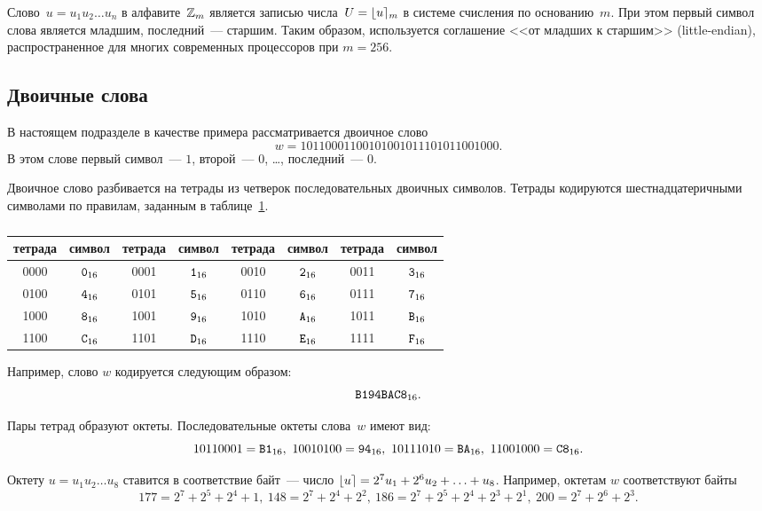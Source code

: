 Слово~$u=u_1 u_2\ldots u_n$ в алфавите~$\mathbb{Z}_m$ является записью 
числа~$U=\lfloor u\rceil_m$ в системе счисления по основанию~$m$. 
При этом первый символ слова является младшим, последний~--- старшим.
%
Таким образом, используется соглашение <<от младших к старшим>> 
(little-endian), распространенное для многих современных процессоров при 
$m=256$. 

\subsection{Двоичные слова}\label{DEFS.BinWords}

В настоящем подразделе в качестве примера рассматривается двоичное слово
$$
w=1011 0001 1001 0100 1011 1010 1100 1000.
$$
В этом слове первый символ~--- $1$, 
второй~--- $0$, \ldots, последний~--- $0$.

Двоичное слово разбивается на тетрады из четверок последовательных 
двоичных символов. 
%
Тетрады кодируются шестнадцатеричными символами по правилам, заданным в 
таблице~\ref{Table.Hex}.

\begin{table}[H]
\caption{}\label{Table.Hex}
\begin{tabular}{|c|c||c|c||c|c||c|c|}
\hline
тетрада & символ & тетрада & символ & тетрада & символ & тетрада & символ\\
\hline
0000 & $\texttt{0}_{16}$ & 0001 & $\texttt{1}_{16}$ & 
0010 & $\texttt{2}_{16}$ & 0011 & $\texttt{3}_{16}$\\
0100 & $\texttt{4}_{16}$ & 0101 & $\texttt{5}_{16}$ & 
0110 & $\texttt{6}_{16}$ & 0111 & $\texttt{7}_{16}$\\ 
1000 & $\texttt{8}_{16}$ & 1001 & $\texttt{9}_{16}$ & 
1010 & $\texttt{A}_{16}$ & 1011 & $\texttt{B}_{16}$\\ 
1100 & $\texttt{C}_{16}$ & 1101 & $\texttt{D}_{16}$ & 
1110 & $\texttt{E}_{16}$ & 1111 & $\texttt{F}_{16}$\\ 
\hline
\end{tabular}
\end{table}

Например, слово $w$ кодируется следующим образом:
$$
\texttt{B194BAC8}_{16}.
$$

Пары тетрад образуют октеты. Последовательные октеты слова~$w$ имеют вид:
$$
1011 0001=\hex{B1},\ 
1001 0100=\hex{94},\ 
1011 1010=\hex{BA},\  
1100 1000=\hex{C8}.
$$

Октету $u=u_1 u_2\ldots u_8$ ставится в соответствие байт~--- 
число $\lfloor u\rceil=2^7u_1+2^6 u_2+\ldots + u_8$. 
Например, октетам $w$ соответствуют байты
$$
177=2^7+2^5+2^4+1,\ 
148=2^7+2^4+2^2,\ 
186=2^7+2^5+2^4+2^3+2^1,\ 
200=2^7+2^6+2^3.
$$

